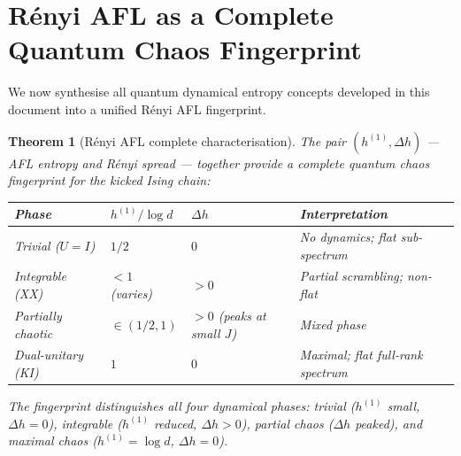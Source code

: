 \documentclass[12pt,a4paper]{article}
\newtheorem{theorem}{Theorem}[section]
\begin{document}
\section{Rényi AFL as a Complete Quantum Chaos Fingerprint}
\label{sec:renyi_fingerprint}

We now synthesise all quantum dynamical entropy concepts developed in
this document into a unified R\'enyi AFL fingerprint.

\begin{theorem}[Rényi AFL complete characterisation]
  \label{thm:renyi_fingerprint}
  The pair $(h^{(1)}, \Delta h)$ — AFL entropy and R\'enyi spread — together
  provide a \emph{complete quantum chaos fingerprint} for the kicked Ising chain:
  \begin{center}
  \begin{tabular}{l|ll|l}
  \hline
  Phase & $h^{(1)}/\log d$ & $\Delta h$ & Interpretation \\
  \hline
  Trivial ($U=I$) & $1/2$ & $0$ & No dynamics; flat sub-spectrum \\
  Integrable (XX) & $<1$ (varies) & $>0$ & Partial scrambling; non-flat \\
  Partially chaotic & $\in(1/2,1)$ & $>0$ (peaks at small $J$) & Mixed phase \\
  Dual-unitary (KI) & $1$ & $0$ & Maximal; flat full-rank spectrum \\
  \hline
  \end{tabular}
  \end{center}
  The fingerprint distinguishes all four dynamical phases: trivial ($h^{(1)}$ small,
  $\Delta h = 0$), integrable ($h^{(1)}$ reduced, $\Delta h > 0$), partial chaos
  ($\Delta h$ peaked), and maximal chaos ($h^{(1)} = \log d$, $\Delta h = 0$).
\end{theorem}
\end{document}
